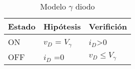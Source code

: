 \begin{table}[htp]
\centering
\caption{Modelo $\gamma$ diodo}
\label{tabla:diodo}
\begin{tabular}{|l|l|l|}
\hline
Estado & Hipótesis   & Verifición        \\ \hline
ON     & $v_D$ = $V_\gamma$ & $i_D$\textgreater0   \\ \hline
OFF    & $i_D$ =0       & $v_D\leq V_\gamma$ \\ \hline
\end{tabular}
\end{table}